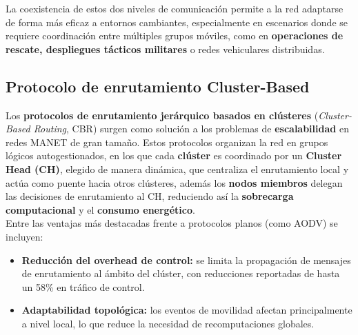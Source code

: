 \documentclass{article}
\begin{document}
La coexistencia de estos dos niveles de comunicación permite a la red adaptarse de forma más eficaz a entornos cambiantes, especialmente en escenarios donde se requiere coordinación entre múltiples grupos móviles, como en \textbf{operaciones de rescate, despliegues tácticos militares} o redes vehiculares distribuidas.

\subsection{Protocolo de enrutamiento Cluster-Based}
Los \textbf{protocolos de enrutamiento jerárquico basados en clústeres} (\textit{Cluster-Based Routing}, CBR) surgen como solución a los problemas de \textbf{escalabilidad} en redes MANET de gran tamaño. Estos protocolos organizan la red en grupos lógicos autogestionados, en los que cada \textbf{clúster} es coordinado por un \textbf{Cluster Head (CH)}, elegido de manera dinámica, que centraliza el enrutamiento local y actúa como puente hacia otros clústeres, además los \textbf{nodos miembros} delegan las decisiones de enrutamiento al CH, reduciendo así la \textbf{sobrecarga computacional} y el \textbf{consumo energético}.\\


Entre las ventajas más destacadas frente a protocolos planos (como AODV) se incluyen:

\begin{itemize}
    \item \textbf{Reducción del overhead de control:} se limita la propagación de mensajes de enrutamiento al ámbito del clúster, con reducciones reportadas de hasta un 58\% en tráfico de control.
    \item \textbf{Adaptabilidad topológica:} los eventos de movilidad afectan principalmente a nivel local, lo que reduce la necesidad de recomputaciones globales.
\end{itemize}
\end{document}
